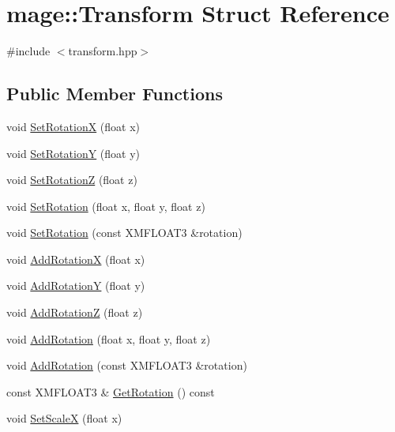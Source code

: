 \hypertarget{structmage_1_1_transform}{}\section{mage\+:\+:Transform Struct Reference}
\label{structmage_1_1_transform}


{\ttfamily \#include $<$transform.\+hpp$>$}

\subsection*{Public Member Functions}
\begin{DoxyCompactItemize}
\item 
void \hyperlink{structmage_1_1_transform_ae526dabb395eea9481fc072624f6bec4}{Set\+RotationX} (float x)
\item 
void \hyperlink{structmage_1_1_transform_a95c83ba282bf84aeb1c49d9ba8242609}{Set\+RotationY} (float y)
\item 
void \hyperlink{structmage_1_1_transform_ac587047697f24d2279e7b4f5ab333f44}{Set\+RotationZ} (float z)
\item 
void \hyperlink{structmage_1_1_transform_a8e8fffa4ae9bc969196151daf4502421}{Set\+Rotation} (float x, float y, float z)
\item 
void \hyperlink{structmage_1_1_transform_a6b15a1591a10fe2984b7e8b0b8c92bd5}{Set\+Rotation} (const X\+M\+F\+L\+O\+A\+T3 \&rotation)
\item 
void \hyperlink{structmage_1_1_transform_ae2a3a4a33ec637b9c39e97519bab5a11}{Add\+RotationX} (float x)
\item 
void \hyperlink{structmage_1_1_transform_afc958d2361a5606962b51646825287e2}{Add\+RotationY} (float y)
\item 
void \hyperlink{structmage_1_1_transform_ae70e192a7d98366b629c3d75a7d2d3bd}{Add\+RotationZ} (float z)
\item 
void \hyperlink{structmage_1_1_transform_a71126843acf10e00d0381b5463978aba}{Add\+Rotation} (float x, float y, float z)
\item 
void \hyperlink{structmage_1_1_transform_a10825624e694790a60e0ea507207132e}{Add\+Rotation} (const X\+M\+F\+L\+O\+A\+T3 \&rotation)
\item 
const X\+M\+F\+L\+O\+A\+T3 \& \hyperlink{structmage_1_1_transform_af049c07a3687a66f0359bd287f2a497d}{Get\+Rotation} () const
\item 
void \hyperlink{structmage_1_1_transform_a4d1fbb0b609e40b6b13e0e282259d223}{Set\+ScaleX} (float x)

\end{DoxyCompactItemize}
